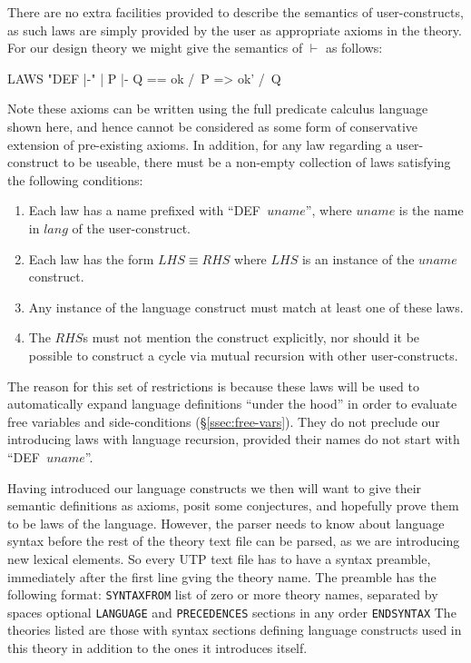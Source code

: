 There are no extra facilities provided to describe the semantics
of user-constructs, as such laws are simply provided by the user as appropriate
axioms in the theory.
For our design theory we might give the semantics of $\vdash$ as follows:
\begin{haskell}
LAWS
  "DEF |-" |  P |- Q  ==  ok /\ P => ok' /\ Q
\end{haskell}
Note these axioms can be written using the full predicate calculus language
shown here, and hence cannot be considered as some form of conservative extension
of pre-existing axioms.
In addition,
for any law regarding a user-construct to be useable,
there must be a non-empty collection of laws satisfying the following conditions:
\begin{enumerate}
  \item
    Each law has a name prefixed with ``DEF\verb*" "$uname$'',
    where $uname$ is the name in $lang$ of the user-construct.
  \item
    Each law has the form $LHS \equiv RHS$
    where $LHS$ is an instance of the $uname$ construct.
  \item
    Any instance of the language construct must match at least one of these laws.
  \item
    The $RHS$s must not mention the construct explicitly,
    nor should it be possible to construct a cycle
    via mutual recursion with other user-constructs.
\end{enumerate}
The reason for this set of restrictions
is because these laws will be used to automatically expand language
definitions ``under the hood'' in order to evaluate free variables
and side-conditions (\S\ref{ssec:free-vars}).
They do not preclude our introducing laws with language recursion,
provided their names do not start with ``DEF\verb*" "$uname$''.

Having introduced our language constructs we then will want to give their
semantic definitions as axioms, posit some conjectures,
and hopefully prove them to be laws of the language.
However, the parser needs to know about language syntax before
the rest of the theory text file can be parsed,
as we are introducing new lexical elements.
So every UTP text file has to have a syntax preamble,
immediately after the first line gving the theory name.
The preamble has the following format:
{\obeylines
\texttt{SYNTAXFROM}
  list of zero or more theory names, separated by spaces
  optional \texttt{LANGUAGE} and \texttt{PRECEDENCES} sections in any order
\texttt{ENDSYNTAX}
}
\noindent
The theories listed are those with syntax sections defining language
constructs used in this theory in addition to the ones it introduces itself.


